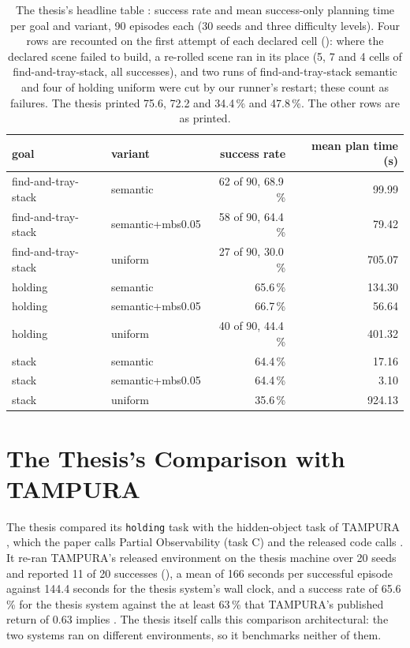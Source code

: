 \begin{table}[tbp]
\centering
\small
\begin{tabular}{llrr}
\toprule
goal & variant & success rate & mean plan time (s) \\
\midrule
find-and-tray-stack & semantic         & 62 of 90, 68.9\,\% &  99.99 \\
find-and-tray-stack & semantic+mbs0.05 & 58 of 90, 64.4\,\% &  79.42 \\
find-and-tray-stack & uniform          & 27 of 90, 30.0\,\% & 705.07 \\
\midrule
holding             & semantic         & 65.6\,\% & 134.30 \\
holding             & semantic+mbs0.05 & 66.7\,\% &  56.64 \\
holding             & uniform          & 40 of 90, 44.4\,\% & 401.32 \\
\midrule
stack               & semantic         & 64.4\,\% &  17.16 \\
stack               & semantic+mbs0.05 & 64.4\,\% &   3.10 \\
stack               & uniform          & 35.6\,\% & 924.13 \\
\bottomrule
\end{tabular}
\caption{The thesis's headline table \cite{alassiri2026thesis}: success rate and
mean success-only planning time per goal and variant, 90 episodes each (30 seeds
and three difficulty levels). Four rows are recounted on the first attempt of each
declared cell (): where the declared scene failed to
build, a re-rolled scene ran in its place (5, 7 and 4 cells of find-and-tray-stack, all
successes), and two runs of find-and-tray-stack semantic and four of holding uniform were
cut by our runner's restart; these count as failures. The thesis printed 75.6, 72.2 and
34.4\,\% and 47.8\,\%. The other rows are as printed.}
\label{tab:thesis-headline}
\end{table}

\section{The Thesis's Comparison with TAMPURA}
\label{sec:thesis-tampura}

The thesis compared its \texttt{holding} task with the hidden-object task of
TAMPURA \cite{curtis2024partially}, which the paper calls Partial Observability
(task C) and the released code calls \fdice. It re-ran TAMPURA's released
environment on the thesis machine over 20 seeds and reported 11 of 20
successes (), a mean of 166 seconds per successful episode against 144.4
seconds for the thesis system's wall clock, and a success rate of 65.6\,\% for the
thesis system against the at least 63\,\% that TAMPURA's published return of 0.63
implies
\cite{alassiri2026thesis,curtis2024partially}. The thesis itself calls this
comparison architectural: the two systems ran on different environments, so it
benchmarks neither of them.

